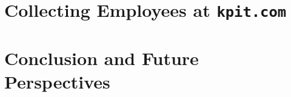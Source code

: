 \documentclass[10pt]{article}
\begin{document}
\blindtext

\section{Collecting Employees at {\tt kpit.com}}
\label{sec:Pune}

\blindtext

\section{Conclusion and Future Perspectives}
\label{sec:concl}

\blindtext






\end{document}

